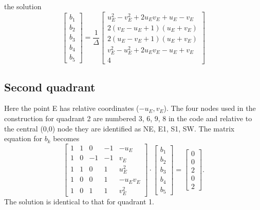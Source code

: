 \documentclass[12pt,letterpaper,margin=0.5in]{report}
\begin{document}
the solution
\begin{equation}
\left[ {\begin{array}{*{20}{c}}
{{b_1}}\\
{{b_2}}\\
{{b_3}}\\
{{b_4}}\\
{{b_5}}
\end{array}} \right] = \frac{1}{\Delta }\left[ {\begin{array}{*{20}{c}}
{u_E^2 - v_E^2 + 2{u_E}{v_E} + {u_E} - {v_E}}\\[4pt]
{2\left( {{v_E} - {u_E} + 1} \right)\left( {{u_E} + {v_E}} \right)}\\[4pt]
{2\left( {{u_E} - {v_E} + 1} \right)\left( {{u_E} + {v_E}} \right)}\\[4pt]
{v_E^2 - u_E^2 + 2{u_E}{v_E} - {u_E} + {v_E}}\\[4pt]
4
\end{array}} \right]
\end{equation}
\subsection{Second quadrant}
Here the point E has relative coordinates ($-u_E, v_E$).  The four nodes used in the
construction for quadrant 2 are numbered 3, 6, 9, 8 in the code and relative to the central (0,0) node they
are identified as NE, E1, S1, SW. The matrix equation for $b_k$ becomes
\begin{equation}
\left[ {\begin{array}{*{20}{r}}
1&1&0&{ - 1}&{ - {u_E}}\\
1&0&{ - 1}&{ - 1}&{{v_E}}\\
1&1&0&1&{u_E^2}\\
1&0&0&1&{ - {u_E}{v_E}}\\
1&0&1&1&{v_E^2}
\end{array}} \right] \cdot \left[ {\begin{array}{*{20}{c}}
{{b_1}}\\
{{b_2}}\\
{{b_3}}\\
{{b_4}}\\
{{b_5}}
\end{array}} \right] = \left[ {\begin{array}{*{20}{c}}
0\\
0\\
2\\
0\\
2
\end{array}} \right].
\end{equation}
The solution is identical to that for quadrant 1.
\end{document}
